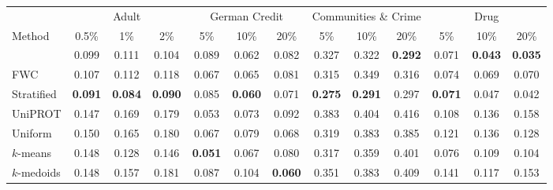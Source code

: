 \begin{tabular}{lcccccccccccc}
\toprule
 & \multicolumn{3}{c}{Adult} & \multicolumn{3}{c}{German Credit} & \multicolumn{3}{c}{Communities \& Crime} & \multicolumn{3}{c}{Drug}\\
\cmidrule(lr){2-4} \cmidrule(lr){5-7} \cmidrule(lr){8-10} \cmidrule(lr){11-13}
Method & 0.5\% & 1\% & 2\% & 5\% & 10\% & 20\% & 5\% & 10\% & 20\% & 5\% & 10\% & 20\%\\
\midrule
\method{} & 0.099 & 0.111 & 0.104 & 0.089 & 0.062 & 0.082 & 0.327 & 0.322 & \textbf{0.292} & 0.071 & \textbf{0.043} & \textbf{0.035}\\
FWC & 0.107 & 0.112 & 0.118 & 0.067 & 0.065 & 0.081 & 0.315 & 0.349 & 0.316 & 0.074 & 0.069 & 0.070\\
Stratified & \textbf{0.091} & \textbf{0.084} & \textbf{0.090} & 0.085 & \textbf{0.060} & 0.071 & \textbf{0.275} & \textbf{0.291} & 0.297 & \textbf{0.071} & 0.047 & 0.042\\
UniPROT & 0.147 & 0.169 & 0.179 & 0.053 & 0.073 & 0.092 & 0.383 & 0.404 & 0.416 & 0.108 & 0.136 & 0.158\\
Uniform & 0.150 & 0.165 & 0.180 & 0.067 & 0.079 & 0.068 & 0.319 & 0.383 & 0.385 & 0.121 & 0.136 & 0.128\\
$k$-means & 0.148 & 0.128 & 0.146 & \textbf{0.051} & 0.067 & 0.080 & 0.317 & 0.359 & 0.401 & 0.076 & 0.109 & 0.104\\
$k$-medoids & 0.148 & 0.157 & 0.181 & 0.087 & 0.104 & \textbf{0.060} & 0.351 & 0.383 & 0.409 & 0.141 & 0.117 & 0.153\\
\bottomrule
\end{tabular}
